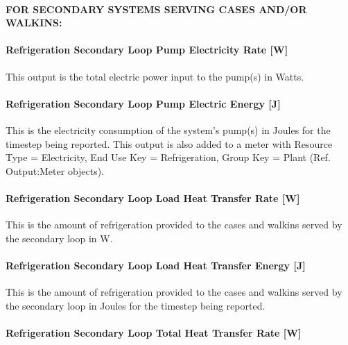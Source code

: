 \paragraph{FOR SECONDARY SYSTEMS SERVING CASES AND/OR WALKINS:}\label{for-secondary-systems-serving-cases-andor-walkins}

\paragraph{Refrigeration Secondary Loop Pump Electricity Rate {[}W{]}}\label{refrigeration-secondary-loop-pump-electric-power-w}

This output is the total electric power input to the pump(s) in Watts.

\paragraph{Refrigeration Secondary Loop Pump Electric Energy {[}J{]}}\label{refrigeration-secondary-loop-pump-electric-energy-j}

This is the electricity consumption of the system's pump(s) in Joules for the timestep being reported. This output is also added to a meter with Resource Type = Electricity, End Use Key = Refrigeration, Group Key = Plant (Ref. Output:Meter objects).

\paragraph{Refrigeration Secondary Loop Load Heat Transfer Rate {[}W{]}}\label{refrigeration-secondary-loop-load-heat-transfer-rate-w}

This is the amount of refrigeration provided to the cases and walkins served by the secondary loop in W.

\paragraph{Refrigeration Secondary Loop Load Heat Transfer Energy {[}J{]}}\label{refrigeration-secondary-loop-load-heat-transfer-energy-j}

This is the amount of refrigeration provided to the cases and walkins served by the secondary loop in Joules for the timestep being reported.

\paragraph{Refrigeration Secondary Loop Total Heat Transfer Rate {[}W{]}}\label{refrigeration-secondary-loop-total-heat-transfer-rate-w}

